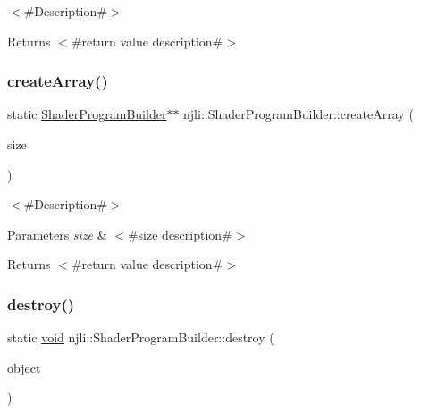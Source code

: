 $<$\#\+Description\#$>$

\begin{DoxyReturn}{Returns}
$<$\#return value description\#$>$ 
\end{DoxyReturn}
\mbox{\label{classnjli_1_1_shader_program_builder_a7ad4dfdff810f39a5d9ea199706527ac}} 
\subsubsection{\texorpdfstring{create\+Array()}{createArray()}}
{\footnotesize\ttfamily static \mbox{\hyperlink{classnjli_1_1_shader_program_builder}{Shader\+Program\+Builder}}$\ast$$\ast$ njli\+::\+Shader\+Program\+Builder\+::create\+Array (\begin{DoxyParamCaption}\item[{const \mbox{\hyperlink{_util_8h_a10e94b422ef0c20dcdec20d31a1f5049}{u32}}}]{size }\end{DoxyParamCaption})\hspace{0.3cm}{\ttfamily [static]}}

$<$\#\+Description\#$>$


\begin{DoxyParams}{Parameters}
{\em size} & $<$\#size description\#$>$\\
\hline
\end{DoxyParams}
\begin{DoxyReturn}{Returns}
$<$\#return value description\#$>$ 
\end{DoxyReturn}
\mbox{\label{classnjli_1_1_shader_program_builder_a9cabb0fb024d57b344c3c62e81c0e950}} 
\subsubsection{\texorpdfstring{destroy()}{destroy()}}
{\footnotesize\ttfamily static \mbox{\hyperlink{_thread_8h_af1e856da2e658414cb2456cb6f7ebc66}{void}} njli\+::\+Shader\+Program\+Builder\+::destroy (\begin{DoxyParamCaption}\item[{\mbox{\hyperlink{classnjli_1_1_shader_program_builder}{Shader\+Program\+Builder}} $\ast$}]{object }\end{DoxyParamCaption})\hspace{0.3cm}{\ttfamily [static]}}

